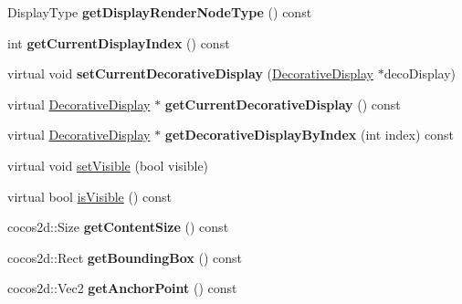 \begin{DoxyCompactItemize}
Display\+Type {\bfseries get\+Display\+Render\+Node\+Type} () const
\item 
\mbox{\label{classcocostudio_1_1DisplayManager_a0933f312794a3cb6091fc8a582c5ed6b}} 
int {\bfseries get\+Current\+Display\+Index} () const
\item 
\mbox{\label{classcocostudio_1_1DisplayManager_ad0a3e620fa9688364e7d62a7f70e11b1}} 
virtual void {\bfseries set\+Current\+Decorative\+Display} (\hyperlink{classcocostudio_1_1DecorativeDisplay}{Decorative\+Display} $\ast$deco\+Display)
\item 
\mbox{\label{classcocostudio_1_1DisplayManager_a16f76c9ea6458e345f1cd306a151f7e7}} 
virtual \hyperlink{classcocostudio_1_1DecorativeDisplay}{Decorative\+Display} $\ast$ {\bfseries get\+Current\+Decorative\+Display} () const
\item 
\mbox{\label{classcocostudio_1_1DisplayManager_ac22f3927305559f2aa52e880157f7e87}} 
virtual \hyperlink{classcocostudio_1_1DecorativeDisplay}{Decorative\+Display} $\ast$ {\bfseries get\+Decorative\+Display\+By\+Index} (int index) const
\item 
virtual void \hyperlink{classcocostudio_1_1DisplayManager_a60d64761f2b8bde07016fe1803b534bc}{set\+Visible} (bool visible)
\item 
virtual bool \hyperlink{classcocostudio_1_1DisplayManager_a4dfa9159cc012bbc466e6c41b39efc36}{is\+Visible} () const
\item 
\mbox{\label{classcocostudio_1_1DisplayManager_aec460ce617e068f87442a353ed02e623}} 
cocos2d\+::\+Size {\bfseries get\+Content\+Size} () const
\item 
\mbox{\label{classcocostudio_1_1DisplayManager_ab4d28b34768723e10bf42f48c377c435}} 
cocos2d\+::\+Rect {\bfseries get\+Bounding\+Box} () const
\item 
\mbox{\label{classcocostudio_1_1DisplayManager_a79afd87b7e92d1966d4a9c0cf10f5a21}} 
cocos2d\+::\+Vec2 {\bfseries get\+Anchor\+Point} () const
\item 

\end{DoxyCompactItemize}

